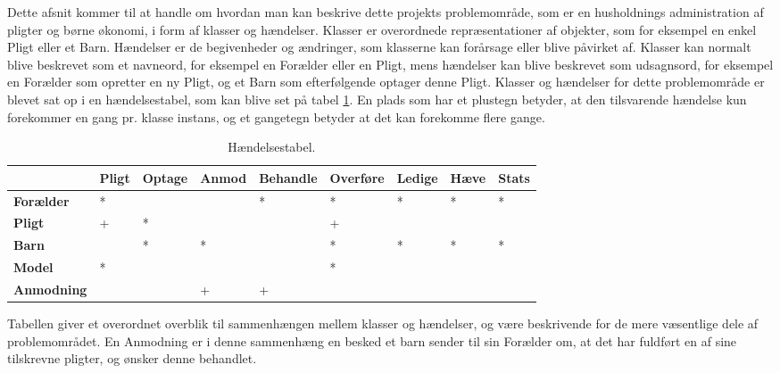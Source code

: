 Dette afsnit kommer til at handle om hvordan man kan beskrive dette projekts problemområde, som er en husholdnings administration af pligter og børne økonomi, i form af klasser og hændelser. Klasser er overordnede repræsentationer af objekter, som for eksempel en enkel Pligt eller et Barn. Hændelser er de begivenheder og ændringer, som klasserne kan forårsage eller blive påvirket af. Klasser kan normalt blive beskrevet som et navneord, for eksempel en Forælder eller en Pligt, mens hændelser kan blive beskrevet som udsagnsord, for eksempel en Forælder som opretter en ny Pligt, og et Barn som efterfølgende optager denne Pligt. Klasser og hændelser for dette problemområde er blevet sat op i en hændelsestabel, som kan blive set på tabel \ref{Haendelstabel}. En plads som har et plustegn betyder, at den tilsvarende hændelse kun forekommer en gang pr. klasse instans, og et gangetegn betyder at det kan forekomme flere gange.

\begin{table}[htb]
	\centering
	\begin{tabular}{| l | >{\centering\arraybackslash}m{1in} | >{\centering\arraybackslash}m{1in} | >{\centering\arraybackslash}m{1in} | >{\centering\arraybackslash}m{1in} | >{\centering\arraybackslash}m{1in} | >{\centering\arraybackslash}m{1in} | >{\centering\arraybackslash}m{1in} | >{\centering\arraybackslash}m{1in} |}
	\hline
	& \textbf{Pligt} & \textbf{Optage} & 
	\textbf{Anmod} & \textbf{Behandle} & 
	\textbf{Overføre} & \textbf{Ledige} & 
	\textbf{Hæve} & \textbf{Stats} \\ \hline
	\textbf{Forælder} & * &  &  & * & * & * & * & * \\ \hline
	\textbf{Pligt} & + & * &  &  & + &  &  &  \\ \hline
	\textbf{Barn} &   & * & * &  & * & * & * & * \\ \hline
	\textbf{Model} & * &  &  &  & * &  &  &  \\ \hline
	\textbf{Anmodning} &  &  & + & + &  &  &  &  \\ \hline
	\end{tabular}
	\caption{Hændelsestabel.}
	\label{Haendelstabel}
\end{table}

Tabellen giver et overordnet overblik til sammenhængen mellem klasser og hændelser, og være beskrivende for de mere væsentlige dele af problemområdet. En Anmodning er i denne sammenhæng en besked et barn sender til sin Forælder om, at det har fuldført en af sine tilskrevne pligter, og ønsker denne behandlet.

